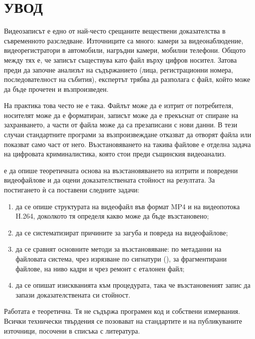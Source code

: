 \section*{УВОД}

Видеозаписът е едно от най-често срещаните веществени доказателства в съвременното
разследване. Източниците са много: камери за видеонаблюдение, видеорегистратори в
автомобили, нагръдни камери, мобилни телефони. Общото между тях е, че записът
съществува като файл върху цифров носител. Затова преди да започне анализът на
съдържанието (лица, регистрационни номера, последователност на събития), експертът
трябва да разполага с файл, който може да бъде прочетен и възпроизведен.

На практика това често не е така. Файлът може да е изтрит от потребителя, носителят
може да е форматиран, записът може да е прекъснат от спиране на захранването, а
части от файла може да са презаписани с нови данни. В тези случаи стандартните
програми за възпроизвеждане отказват да отворят файла или показват само част от него.
Възстановяването на такива файлове е отделна задача на цифровата криминалистика, която
стои преди същинския видеоанализ.

 е да опише теоретичната основа на възстановяването на
изтрити и повредени видеофайлове и да оцени доказателствената стойност на резултата.
За постигането ѝ са поставени следните задачи:

\begin{enumerate}[leftmargin=2cm]
  \item да се опише структурата на видеофайл във формат MP4 и на видеопотока H.264,
        доколкото тя определя какво може да бъде възстановено;
  \item да се систематизират причините за загуба и повреда на видеофайлове;
  \item да се сравнят основните методи за възстановяване: по метаданни на файловата
        система, чрез изрязване по сигнатури (), за фрагментирани
        файлове, на ниво кадри и чрез ремонт с еталонен файл;
  \item да се опишат изискванията към процедурата, така че възстановеният запис да
        запази доказателствената си стойност.
\end{enumerate}

Работата е теоретична. Тя не съдържа програмен код и собствени измервания. Всички
технически твърдения се позовават на стандартите и на публикуваните източници,
посочени в списъка с литература.
